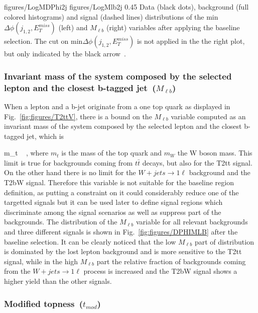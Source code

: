                  {figures/LogMDPhi2j} %
                 {figures/LogMlb2j} %
                 {0.45}       %
                 { Data (black dots), background (full colored histograms) and signal (dashed lines) distributions of the min$\Delta \phi (j_{1,2}, E_{T}^{miss})$ (left) and $M_{\ell b}$ (right) variables after applying the baseline selection. The cut on min$\Delta \phi (j_{1,2}, E_{T}^{miss})$  is not applied in the the right plot, but only indicated by the black arrow~\cite{website:stopSupp}. }

\subsubsection{Invariant mass of the system composed by the selected lepton and the closest b-tagged jet~($M_{\ell b}$)}

When a lepton and a b-jet originate from a one top quark as displayed in Fig.~\ref{fig:figures/T2ttV}, there is a bound on the $M_{\ell b}$ variable computed as an invariant mass of the system composed by the selected lepton and the closest b-tagged jet, which is

{
 m_{t}  ~ ,
}
where $m_{t}$ is the mass of the top quark and $m_{W}$ the W boson mass. This limit is true for backgrounds coming from $t\bar{t}$ decays, but also for the T2tt signal. On the other hand there is no limit for the $W+jets \to 1\ell$  background and the T2bW signal. Therefore this variable is not suitable for the baseline region definition, as putting a constraint on it could considerably reduce one of the targetted signals but it can be used later to define signal regions which discriminate among the signal scenarios as well as suppress part of the backgrounds. The distribution of the  $M_{\ell b}$ variable for all relevant backgrounds and three different signals is shown in Fig.~\ref{fig:figures/DPHIMLB} after the baseline selection. It can be clearly noticed that the low $M_{\ell b}$ part of distribution is dominated by the lost lepton background and is more sensitive to the T2tt signal, while in  the high $M_{\ell b}$ part the relative fraction of backgrounds coming from the $W+jets \to 1\ell$ process is increased and the T2bW  signal shows a higher yield than the other signals.

\subsubsection{Modified topness~($t_{mod}$)}

